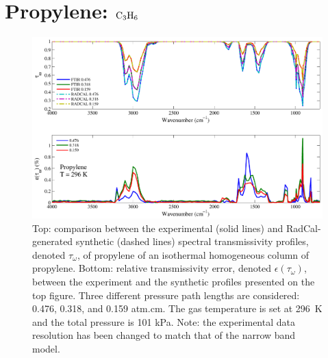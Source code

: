 \clearpage

\section{Propylene: $\rm C_3H_6$}

\begin{figure}[h]
\includegraphics[width=\textwidth]{../Verification/Results_Test2/Propylene_296.pdf}
\caption{Top: comparison between the experimental (solid lines) and RadCal-generated synthetic (dashed lines) spectral transmissivity profiles, denoted $\tau_{\omega}$, of propylene of an isothermal homogeneous column of propylene. Bottom: relative transmissivity error, denoted $\epsilon{(\tau_{\omega})}$, between the experiment and the synthetic profiles presented on the top figure. Three different pressure path lengths are considered: 0.476, 0.318, and 0.159 atm.cm. The gas temperature is set at 296~K and the total pressure is 101 kPa. Note: the experimental data resolution has been changed to match that of the narrow band model. \label{fig:propylene_Verify_296K}}
\end{figure}

\newpage

